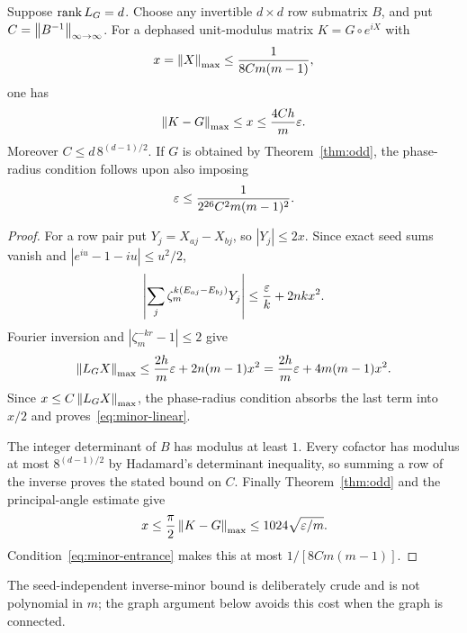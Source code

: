\begin{proposition}\label{prop:minor}
Suppose $\operatorname{rank} L_G=d$. Choose any invertible $d\times d$ row submatrix $B$, and put $C=\left\lVert B^{-1}\right\rVert_{\infty\to\infty}$. For a dephased unit-modulus matrix $K=G\circ e^{iX}$ with
\[
 x=\left\lVert X\right\rVert_{\mathrm{max}}\le\frac1{8Cm(m-1)},
\]
one has
\begin{equation}\label{eq:minor-linear}
 \left\lVert K-G\right\rVert_{\mathrm{max}}\le x\le\frac{4Ch}{m}\varepsilon.
\end{equation}
Moreover $C\le d\,8^{(d-1)/2}$. If $G$ is obtained by Theorem~\ref{thm:odd}, the phase-radius condition follows upon also imposing
\begin{equation}\label{eq:minor-entrance}
 \varepsilon\le\frac1{2^{26}C^2m(m-1)^2}.
\end{equation}
\end{proposition}
\begin{proof}
For a row pair put $Y_j=X_{aj}-X_{bj}$, so $|Y_j|\le2x$. Since exact seed sums vanish and $|e^{iu}-1-iu|\le u^2/2$,
\[
 \left|\sum_j\zeta_m^{k(E_{aj}-E_{bj})}Y_j\right|
 \le\frac{\varepsilon} k+2nkx^2.
\]
Fourier inversion and $|\zeta_m^{-kr}-1|\le2$ give
\[
 \left\lVert L_GX\right\rVert_{\mathrm{max}}\le\frac{2h}{m}\varepsilon+2n(m-1)x^2
 =\frac{2h}{m}\varepsilon+4m(m-1)x^2.
\]
Since $x\le C\left\lVert L_GX\right\rVert_{\mathrm{max}}$, the phase-radius condition absorbs the last term into $x/2$ and proves~\eqref{eq:minor-linear}.

The integer determinant of $B$ has modulus at least $1$. Every cofactor has modulus at most $8^{(d-1)/2}$ by Hadamard's determinant inequality, so summing a row of the inverse proves the stated bound on $C$. Finally Theorem~\ref{thm:odd} and the principal-angle estimate give
\[
 x\le\frac\pi2\left\lVert K-G\right\rVert_{\mathrm{max}}\le1024\sqrt{\varepsilon/m}.
\]
Condition~\eqref{eq:minor-entrance} makes this at most $1/[8Cm(m-1)]$.
\end{proof}
The seed-independent inverse-minor bound is deliberately crude and is not polynomial in $m$; the graph argument below avoids this cost when the graph is connected.

